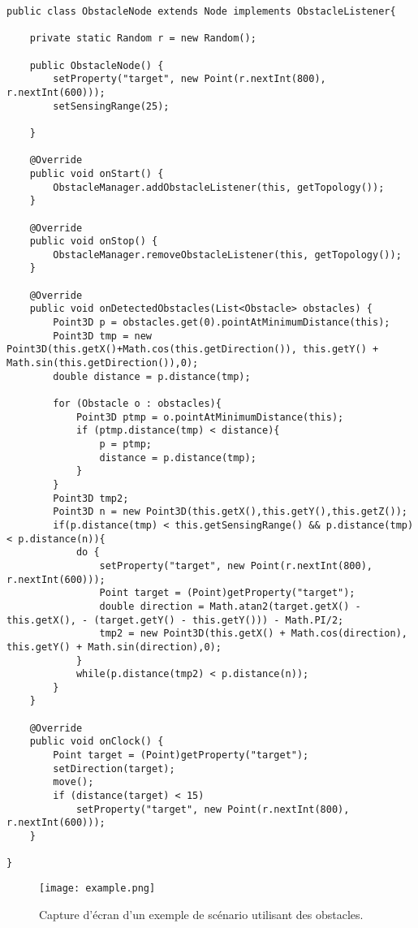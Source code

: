 \documentclass{article}
\begin{document}
\begin{lstlisting}[frame=shadowbox,captionpos=b,caption={Classe ObstacleNode},abovecaptionskip=2ex,label={obstaclenode}]
public class ObstacleNode extends Node implements ObstacleListener{

    private static Random r = new Random();

    public ObstacleNode() {
        setProperty("target", new Point(r.nextInt(800), r.nextInt(600)));
        setSensingRange(25);

    }

    @Override
    public void onStart() {
        ObstacleManager.addObstacleListener(this, getTopology());
    }

    @Override
    public void onStop() {
        ObstacleManager.removeObstacleListener(this, getTopology());
    }

    @Override
    public void onDetectedObstacles(List<Obstacle> obstacles) {
        Point3D p = obstacles.get(0).pointAtMinimumDistance(this);
        Point3D tmp = new Point3D(this.getX()+Math.cos(this.getDirection()), this.getY() + Math.sin(this.getDirection()),0);
        double distance = p.distance(tmp);

        for (Obstacle o : obstacles){
            Point3D ptmp = o.pointAtMinimumDistance(this);
            if (ptmp.distance(tmp) < distance){
                p = ptmp;
                distance = p.distance(tmp);
            }
        }
        Point3D tmp2;
        Point3D n = new Point3D(this.getX(),this.getY(),this.getZ());
        if(p.distance(tmp) < this.getSensingRange() && p.distance(tmp) < p.distance(n)){
            do {
                setProperty("target", new Point(r.nextInt(800), r.nextInt(600)));
                Point target = (Point)getProperty("target");
                double direction = Math.atan2(target.getX() - this.getX(), - (target.getY() - this.getY())) - Math.PI/2;
                tmp2 = new Point3D(this.getX() + Math.cos(direction), this.getY() + Math.sin(direction),0);
            }
            while(p.distance(tmp2) < p.distance(n));
        }
    }

    @Override
    public void onClock() {
        Point target = (Point)getProperty("target");
        setDirection(target);
        move();
        if (distance(target) < 15)
            setProperty("target", new Point(r.nextInt(800), r.nextInt(600)));
    }

}
\end{lstlisting}

\begin{figure}[h]
\centering
\texttt{[image: example.png]}
\caption{Capture d'écran d'un exemple de scénario utilisant des obstacles.}
\label{obstacle:fig:exemple}
\end{figure}
\end{document}
